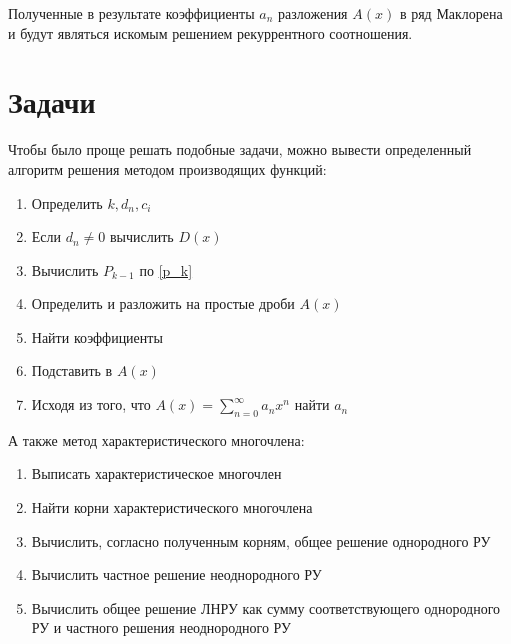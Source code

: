 Полученные в результате коэффициенты $a_n$ разложения $A(x)$ в ряд Маклорена и будут являться
искомым решением рекуррентного соотношения.

\section{Задачи}
Чтобы было проще решать подобные задачи, можно вывести определенный алгоритм решения методом
производящих функций:
\begin{enumerate}
    \item Определить $k, d_n, c_i$
    \item Если $d_n \neq 0$ вычислить $D(x)$
    \item Вычислить $P_{k-1}$ по \ref{p_k}
    \item Определить и разложить на простые дроби $A(x)$
    \item Найти коэффициенты
    \item Подставить в $A(x)$
    \item Исходя из того, что $A(x) = \sum_{n = 0}^{\infty} a_n x^n$ найти $a_n$
\end{enumerate}
А также метод характеристического многочлена:
\begin{enumerate}
    \item Выписать характеристическое многочлен
    \item Найти корни характеристического многочлена
    \item Вычислить, согласно полученным корням, общее решение однородного РУ
    \item Вычислить частное решение неоднородного РУ
    \item Вычислить общее решение ЛНРУ как сумму соответствующего однородного РУ 
    и частного решения неоднородного РУ
\end{enumerate}
